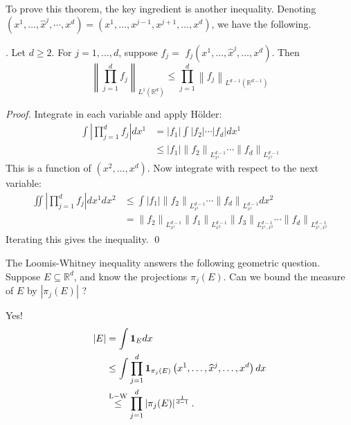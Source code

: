 To prove this theorem, the key ingredient is another inequality. Denoting $\left(x^{1}, \ldots, \widehat{x}^{j}, \cdots, x^{d}\right)=\left(x^{1}, \ldots, x^{j-1}, x^{j+1}, \ldots, x^{d}\right)$, we have the following.

\begin{lemma}
    . Let $d \geq 2$. For $j=1, \ldots, d$, suppose $f_{j}=$ $f_{j}\left(x^{1}, \ldots, \widehat{x}^{j}, \ldots, x^{d}\right)$. Then
    $$
    \left\|\prod_{j=1}^{d} f_{j}\right\|_{L^{1}\left(\mathbb{R}^{d}\right)} \leq \prod_{j=1}^{d}\left\|f_{j}\right\|_{L^{d-1}\left(\mathbb{R}^{d-1}\right)}
    $$

\end{lemma}
\begin{proof}
     Integrate in each variable and apply Hölder:
    $$
    \begin{aligned}
    \int\left|\prod_{j=1}^{d} f_{j}\right| d x^{1} &=\left|f_{1}\right| \int\left|f_{2}\right| \cdots\left|f_{d}\right| d x^{1} \\
    & \leq\left|f_{1}\right|\left\|f_{2}\right\|_{L_{x^{1}}^{d-1}} \cdots\left\|f_{d}\right\|_{L_{x^{1}}^{d-1}}
    \end{aligned}
    $$
    This is a function of $\left(x^{2}, \ldots, x^{d}\right)$. Now integrate with respect to the next variable:
$$
\begin{aligned}
\iint\left|\prod_{j=1}^{d} f_{j}\right| d x^{1} d x^{2} & \leq \int\left|f_{1}\right|\left\|f_{2}\right\|_{L_{x^{1}}^{d-1}} \cdots\left\|f_{d}\right\|_{L_{x^{1}}^{d-1}} d x^{2} \\
&=\left\|f_{2}\right\|_{L_{x^{1}}^{d-1}}\left\|f_{1}\right\|_{L_{x^{2}}^{d-1}}\left\|f_{3}\right\|_{L_{x^{1}, x^{2}}^{d-1}} \cdots\left\|f_{d}\right\|_{L_{x^{1}, x^{2}}^{d-1}}
\end{aligned}
$$
Iterating this gives the inequality.
\qed 
\end{proof}


\begin{remark}
    The Loomis-Whitney inequality answers the following geometric question. Suppose $E \subseteq \mathbb{R}^{d}$, and know the projections $\pi_{j}(E)$. Can we bound the measure of $E$ by $\left|\pi_{j}(E)\right|$ ?
    \begin{figure}[H]
        \centering
    \end{figure}
    Yes!
$$
\begin{aligned}
|E| &=\int {\bm 1}_{E} d x \\
& \leq \int \prod_{j=1}^{d} {\bm 1}_{\pi_{j}(E)}\left(x^{1}, \ldots, \widehat{x}^{j}, \ldots, x^{d}\right) d x \\
& \stackrel{\mathrm{L}-\mathrm{W}}{\leq} \prod_{j=1}^{d}\left|\pi_{j}(E)\right|^{\frac{1}{d-1}} .
\end{aligned}
$$
\end{remark}

